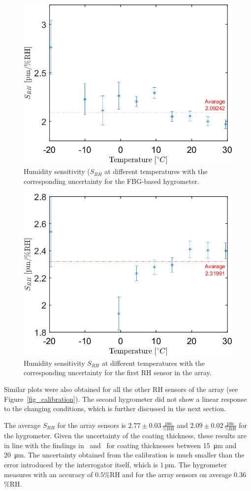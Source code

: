 \begin{figure}[!h]
\centering
\includegraphics[width=0.55\columnwidth]{Chapter5/images/RHS_RH.png}
\caption{Humidity sensitivity ($S_{RH}$ at different temperatures with the corresponding uncertainty for the FBG-based hygrometer.}
\label{fig_RH_sens}
\end{figure}
\begin{figure}[!h]
\centering
\includegraphics[width=0.55\columnwidth]{Chapter5/images/RH1_RH.png}
\caption{Humidity sensitivity $S_{RH}$ at different temperatures with the corresponding uncertainty for the first \gls{RH} sensor in the array.}
\label{fig_RH_sens2}
\end{figure}

Similar plots were also obtained for all the other \gls{RH} sensors of the array (see Figure~\ref{fig_calibration}). The second hygrometer did not show a linear response to the changing conditions, which is further discussed in the next section.

The average $S_{RH}$ for the array sensors is $2.77\pm 0.03\,\mathrm{\frac{pm}{\%RH}}$  and $2.09\pm 0.02\,\mathrm{\frac{pm}{\%RH}}$ for the hygrometer. Given the uncertainty of the coating thickness, these results are in line with the findings in~\cite{YEO_PI} and~\cite{Kronenberg:02} for coating thicknesses between \SI{15}{\micro\metre} and \SI{20}{\micro\metre}. The uncertainty obtained from the calibration is much smaller than the error introduced by the interrogator itself, which is $1$\,pm. The hygrometer measures with an accuracy of $0.5$\%RH and for the array sensors on average $0.36$\%RH. 

